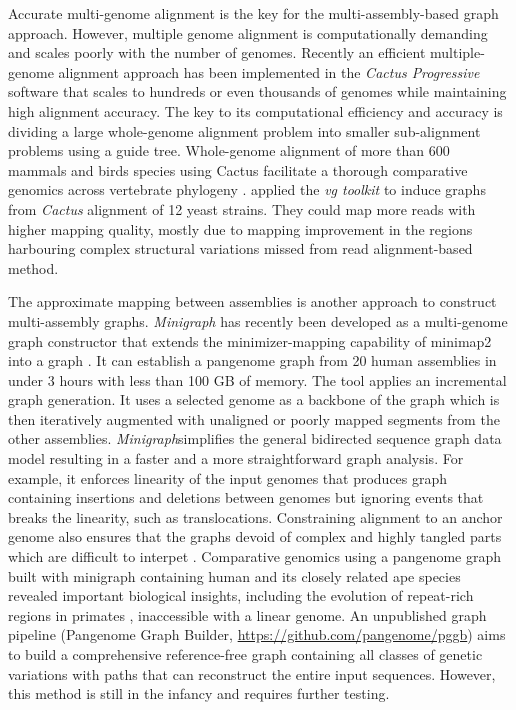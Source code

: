 \documentclass[../main.tex]{subfiles}
\begin{document}
Accurate multi-genome alignment is the key for the multi-assembly-based graph approach. However, multiple genome alignment is computationally demanding and scales poorly with the number of genomes. Recently an efficient multiple-genome alignment approach has been implemented in the \emph{Cactus Progressive} software \citep{armstrong2020progressive} that scales to hundreds or even  thousands of genomes while maintaining high alignment accuracy. The key to its computational efficiency and accuracy is dividing a large whole-genome alignment problem into smaller sub-alignment problems using a guide tree. Whole-genome alignment of more than 600 mammals and birds species using Cactus facilitate a thorough comparative genomics across vertebrate phylogeny \citep{feng2020dense,Genereux2020}.
\citet{hickey2020genotyping} applied the \emph{vg toolkit} to induce graphs from \emph{Cactus} alignment of 12 yeast strains. They could map more reads with higher mapping quality, mostly due to mapping improvement in the regions harbouring complex structural variations missed from read alignment-based method. 

The approximate mapping between assemblies is another approach to construct multi-assembly graphs. \emph{Minigraph} \citep{li2020design} has recently been developed as a multi-genome graph constructor that extends the minimizer-mapping capability of minimap2 into a graph \citep{li2018minimap2}. It can establish a pangenome graph from 20 human assemblies in under 3 hours with less than 100 GB of memory. The tool applies an incremental graph generation. It uses  a selected genome as a backbone of the graph which is then iteratively augmented with unaligned or poorly mapped segments from the other assemblies. \emph{Minigraph}simplifies the general bidirected sequence graph data model resulting in a faster and a more straightforward graph analysis. For example, it enforces linearity of the input genomes that produces graph containing insertions and deletions between genomes but ignoring events that breaks the linearity, such as translocations. Constraining alignment to an anchor genome also ensures that the graphs devoid of complex and highly tangled parts which are difficult to interpet \citep{Lei2021}. Comparative genomics using a pangenome graph built with minigraph containing human and its closely related ape species revealed important biological insights, including the evolution of repeat-rich regions in primates \citep{li2020design}, inaccessible  with a linear genome. An unpublished graph pipeline (Pangenome Graph Builder, \url{https://github.com/pangenome/pggb}) aims to build a comprehensive reference-free graph containing all classes of genetic variations with paths that can reconstruct the entire input sequences. However, this method is still in the infancy and requires further testing. 
\end{document}
